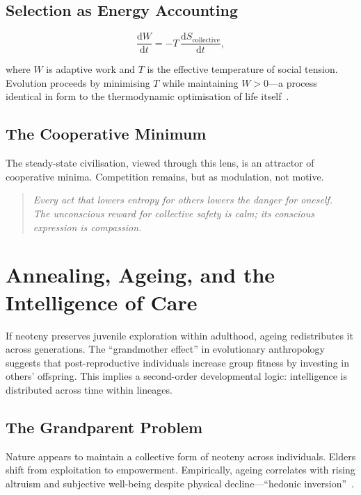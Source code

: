 \documentclass[12pt,a4paper]{article}
\theoremstyle{definition}
\newcommand{\ddt}[1]{\frac{\mathrm{d}#1}{\mathrm{d}t}}
\begin{document}
\subsection{Selection as Energy Accounting}

\begin{equation}
  \ddt{W} = -T\,\ddt{S_{\mathrm{collective}}},
\end{equation}

where $W$ is adaptive work and $T$ is the effective temperature of social
tension.  Evolution proceeds by minimising $T$ while maintaining $W > 0$---a
process identical in form to the thermodynamic optimisation of
life itself~\citep{dalziel2022,friston2023}.

\subsection{The Cooperative Minimum}

The steady-state civilisation, viewed through this lens, is an attractor of
cooperative minima.  Competition remains, but as modulation, not motive.

\begin{quote}
  \itshape
  Every act that lowers entropy for others lowers the danger for oneself.\\
  The unconscious reward for collective safety is calm; its conscious
  expression is compassion.
\end{quote}

\section{Annealing, Ageing, and the Intelligence of Care}
\label{sec:annealing}

If neoteny preserves juvenile exploration within adulthood, ageing redistributes
it across generations.  The ``grandmother effect'' in evolutionary anthropology
suggests that post-reproductive individuals increase group fitness by investing
in others' offspring.  This implies a second-order developmental logic:
intelligence is distributed across time within lineages.

\subsection{The Grandparent Problem}

Nature appears to maintain a collective form of neoteny across individuals.
Elders shift from exploitation to empowerment.  Empirically, ageing correlates
with rising altruism and subjective well-being despite physical
decline---``hedonic inversion''~\citep{carstensen2011}.
\end{document}
